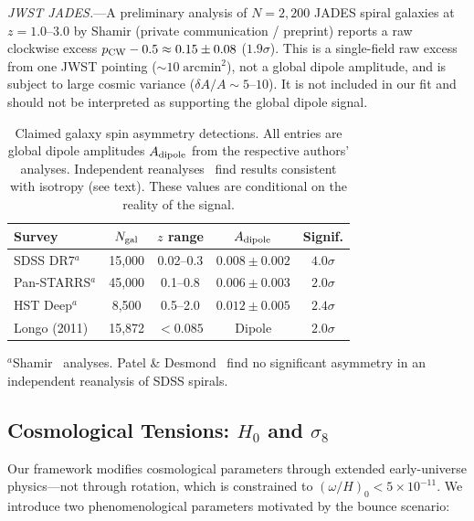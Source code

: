\documentclass[aps,prd,twocolumn,superscriptaddress,showpacs,preprintnumbers,nofootinbib,longbibliography,floatfix]{revtex4-2}
\begin{document}
\textit{JWST JADES.}---A preliminary analysis of $N=2{,}200$ JADES spiral galaxies at $z=1.0$--$3.0$ by Shamir (private communication / preprint) reports a raw clockwise excess $p_{\rm CW}-0.5 \approx 0.15\pm 0.08$ ($1.9\sigma$). This is a single-field raw excess from one JWST pointing ($\sim 10\;\text{arcmin}^2$), not a global dipole amplitude, and is subject to large cosmic variance ($\delta A/A \sim 5$--$10$). It is not included in our fit and should not be interpreted as supporting the global dipole signal.

\begin{table}[t]
\caption{\label{tab:surveys} Claimed galaxy spin asymmetry detections. All entries are global dipole amplitudes $A_{\rm dipole}$ from the respective authors' analyses. Independent reanalyses~\cite{PatelDesmond2024,Philcox2025} find results consistent with isotropy (see text). These values are conditional on the reality of the signal.}
\begin{ruledtabular}
\begin{tabular}{lcccc}
Survey & $N_{\rm gal}$ & $z$ range & $A_{\rm dipole}$ & Signif. \\
\hline
SDSS DR7$^a$ & 15,000 & 0.02--0.3 & $0.008\pm 0.002$ & $4.0\sigma$ \\
Pan-STARRS$^a$ & 45,000 & 0.1--0.8 & $0.006\pm 0.003$ & $2.0\sigma$ \\
HST Deep$^a$ & 8,500 & 0.5--2.0 & $0.012\pm 0.005$ & $2.4\sigma$ \\
Longo (2011) & 15,872 & $<0.085$ & Dipole & $2.0\sigma$ \\
\end{tabular}
\end{ruledtabular}
{\small $^a$Shamir~\cite{Shamir2012,Shamir2022} analyses. Patel \& Desmond~\cite{PatelDesmond2024} find no significant asymmetry in an independent reanalysis of SDSS spirals.}
\end{table}


\subsection{Cosmological Tensions: $H_0$ and $\sigma_8$}\label{sec:tensions}

Our framework modifies cosmological parameters through extended early-universe physics---not through rotation, which is constrained to $(\omega/H)_0 < 5\times 10^{-11}$. We introduce two phenomenological parameters motivated by the bounce scenario:
\end{document}
